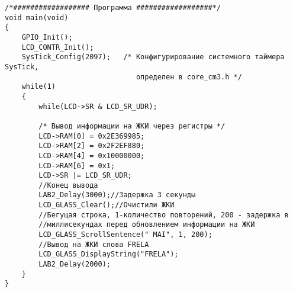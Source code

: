 \begin{verbatim}
/*################## Программа ##################*/
void main(void)
{
    GPIO_Init();
    LCD_CONTR_Init();
    SysTick_Config(2097);   /* Конфигурирование системного таймера SysTick,
                               определен в core_cm3.h */
    while(1)
    {
        while(LCD->SR & LCD_SR_UDR);
        
        /* Вывод информации на ЖКИ через регистры */
        LCD->RAM[0] = 0x2E369985;
        LCD->RAM[2] = 0x2F2EF880;
        LCD->RAM[4] = 0x10000000;
        LCD->RAM[6] = 0x1;
        LCD->SR |= LCD_SR_UDR;
        //Конец вывода
        LAB2_Delay(3000);//Задержка 3 секунды
        LCD_GLASS_Clear();//Очистили ЖКИ
        //Бегущая строка, 1-количество повторений, 200 - задержка в
        //миллисекундах перед обновлением информации на ЖКИ
        LCD_GLASS_ScrollSentence(" MAI", 1, 200);
        //Вывод на ЖКИ слова FRELA
        LCD_GLASS_DisplayString("FRELA");
        LAB2_Delay(2000);
    }
}
\end{verbatim}